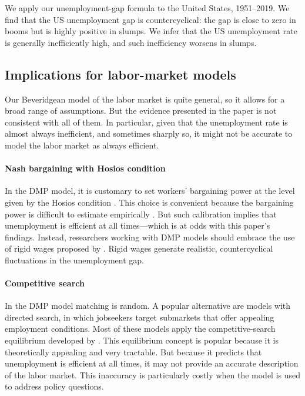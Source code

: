 \documentclass[letterpaper,12pt,leqno]{article}
\begin{document}
We apply our unemployment-gap formula to the United States, 1951--2019. We find that the US unemployment gap is countercyclical: the gap is close to zero in booms but is highly positive in slumps. We infer that the US unemployment rate is generally inefficiently high, and such inefficiency worsens in slumps. 

\subsection{Implications for labor-market models}

Our Beveridgean model of the labor market is quite general, so it allows for a broad range of assumptions. But the evidence presented in the paper is not consistent with all of them. In particular, given that the unemployment rate is almost always inefficient, and sometimes sharply so, it might not be accurate to model the labor market as always efficient.

\paragraph{Nash bargaining with Hosios condition} In the DMP model, it is customary to set workers' bargaining power at the level given by the Hosios condition . This choice is convenient because the bargaining power is difficult to estimate empirically . But such calibration implies that unemployment is efficient at all times---which is at odds with this paper's findings. Instead, researchers working with DMP models should embrace the use of rigid wages proposed by . Rigid wages generate realistic, countercyclical fluctuations in the unemployment gap.

\paragraph{Competitive search} In the DMP model matching is random. A popular alternative are models with directed search, in which jobseekers target submarkets that offer appealing employment conditions. Most of these models apply the competitive-search equilibrium developed by . This equilibrium concept is popular because it is theoretically appealing and very tractable. But because it predicts that unemployment is efficient at all times, it may not provide an accurate description of the labor market. This inaccuracy is particularly costly when the model is used to address policy questions.
\end{document}
